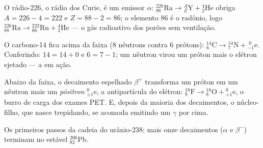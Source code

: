 \begin{example}\label{ex:g11:nucleus-radioactivity:alpha}
O rádio-226, o rádio dos Curie, é um emissor $\alpha$:
${}^{226}_{88}\mathrm{Ra} \to {}^{A}_{Z}\mathrm{Y} + {}^{4}_{2}\mathrm{He}$
obriga $A = 226 - 4 = 222$ e $Z = 88 - 2 = 86$; o elemento $86$ é o
radônio, logo
${}^{226}_{88}\mathrm{Ra} \to {}^{222}_{86}\mathrm{Rn} + {}^{4}_{2}\mathrm{He}$
--- o gás radioativo dos porões sem ventilação.
\end{example}

\begin{example}\label{ex:g11:nucleus-radioactivity:beta}
O carbono-14 fica acima da faixa ($8$ nêutrons contra $6$ prótons):
${}^{14}_{6}\mathrm{C} \to {}^{14}_{7}\mathrm{N} + {}^{\;0}_{-1}\mathrm{e}$.
Conferindo: $14 = 14 + 0$ e $6 = 7 - 1$; um nêutron virou um próton mais o
elétron ejetado --- a  em ação.
\end{example}

\begin{remark}\label{rem:g11:nucleus-radioactivity:betaplus}
Abaixo da faixa, o decaimento espelhado $\beta^+$ transforma um próton em
um nêutron mais um \emph{pósitron}
${}^{0}_{+1}\mathrm{e}$, a antipartícula do elétron:
${}^{18}_{9}\mathrm{F} \to {}^{18}_{8}\mathrm{O} + {}^{0}_{+1}\mathrm{e}$,
o burro de carga dos exames PET. E, depois da maioria dos decaimentos, o
núcleo-filho, que nasce trepidando, se acomoda emitindo um $\gamma$ por
cima.
\end{remark}

\begin{omfigure}

{\small Os primeiros passos da cadeia do urânio-238; mais onze
decaimentos ($\alpha$ e $\beta^-$) terminam no estável
${}^{206}_{82}\mathrm{Pb}$.}
\end{omfigure}

